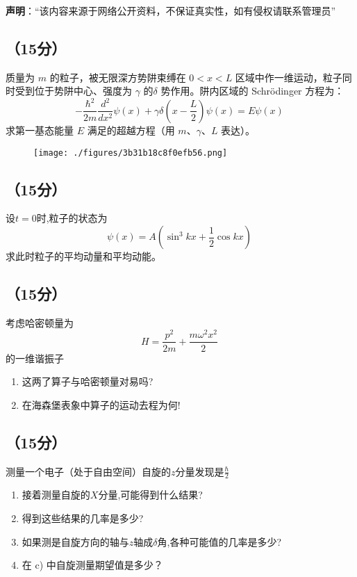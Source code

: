 
\textbf{声明}：“该内容来源于网络公开资料，不保证真实性，如有侵权请联系管理员”

\subsection{（15分）}
质量为 $m$ 的粒子，被无限深方势阱束缚在 $0 < x < L$ 区域中作一维运动，粒子同时受到位于势阱中心、强度为 $\gamma$ 的$\delta$ 势作用。阱内区域的 Schrödinger 方程为：
\[
-\frac{\hbar^2}{2m}\frac{d^2 }{dx^2}\psi(x) + \gamma \delta \left(x - \frac{L}{2}\right)\psi(x) = E \psi(x)~
\]
求第一基态能量 $E$ 满足的超越方程（用 $m$、$\gamma$、$L$ 表达）。
\begin{figure}[ht]
\centering
\texttt{[image: ./figures/3b31b18c8f0efb56.png]}
\caption{} \label{fig_SEU01_1}
\end{figure}

\subsection{（15分）}
设$t=0$时,粒子的状态为
 \[\psi(x) = A \left( \sin^3 kx + \frac{1}{2} \cos kx \right)~\]
求此时粒子的平均动量和平均动能。

\subsection{（15分）}
考虑哈密顿量为 
\[H = \frac{p^2}{2m} + \frac{m \omega^2 x^2}{2}~\]
的一维谐振子
\begin{enumerate}
    “初始位置”  和“初始动量” 的算子：
    \[
    x_0 = x \cos \omega t - \frac{p}{m \omega} \sin \omega t~
    \]
    \[
    p_0 = p \cos \omega t + m \omega x \sin \omega t~
    \]
    的期待值对时间的依赖关系。
    \item  这两了算子与哈密顿量对易吗?
    \item  在海森堡表象中算子的运动去程为何!
\end{enumerate}

\subsection{（15分）}测量一个电子（处于自由空间）自旋的$z$分量发现是$\frac{\hbar}{2}$
\begin{enumerate}
\item 接着测量自旋的$X$分量,可能得到什么结果?
\item 得到这些结果的几率是多少?
\item 如果测是自旋方向的轴与$z$轴成$\delta$角,各种可能值的几率是多少?
\item 在 c) 中自旋测量期望值是多少？
\end{enumerate}
